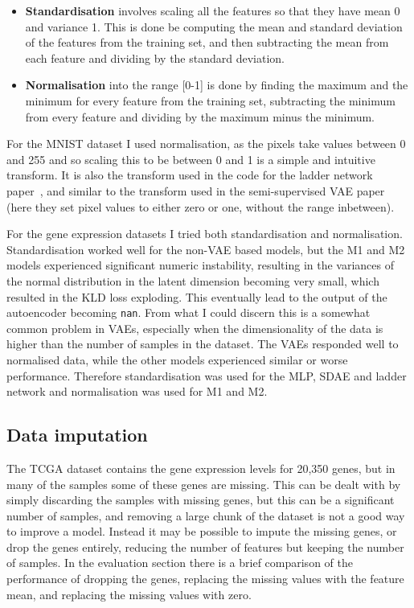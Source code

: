 \begin{itemize}
  \item \textbf{Standardisation} involves scaling all the features so that they have mean 0 and variance 1. This is done be computing the mean 
          and standard deviation of the features from the training set, and then subtracting the mean from each feature and dividing by the
          standard deviation.
  \item \textbf{Normalisation} into the range [0-1] is done by finding the maximum and the minimum for every feature from the training set,
          subtracting the minimum from every feature and dividing by the maximum minus the minimum.
\end{itemize}

For the MNIST dataset I used normalisation, as the pixels take values between 0 and 255 and so scaling this to be between 0 and 1 is 
a simple and intuitive transform. It is also the transform used in the code for the ladder network paper~\cite{DBLP:journals/corr/RasmusVHBR15}, 
and similar to the transform used in the semi-supervised VAE paper~\cite{DBLP:journals/corr/KingmaRMW14} (here they set pixel values to 
either zero or one, without the range inbetween).

For the gene expression datasets I tried both standardisation and normalisation. Standardisation worked well for the non-VAE based models,
but the M1 and M2 models experienced significant numeric instability, resulting in the variances of the normal distribution in the latent dimension 
becoming very small, which resulted in the KLD loss exploding.
This eventually lead to the output of the autoencoder becoming \texttt{nan}. From what I could discern this is a somewhat common problem in
VAEs, especially when the dimensionality of the data is higher than the number of samples in the dataset. The VAEs responded well to normalised
data, while the other models experienced similar or worse performance. Therefore standardisation was used for the MLP, SDAE and ladder 
network and normalisation was used for M1 and M2.

\subsection{Data imputation} \label{imput}
The TCGA dataset contains the gene expression levels for 20,350 genes, but in many of the samples some of these genes are missing.
This can be dealt with by simply discarding the samples with missing genes, but this can be a significant number of samples, and removing 
a large chunk of the dataset is not a good way to improve a model. Instead it may be possible to impute the missing genes, or drop the 
genes entirely, reducing the number of features but keeping the number of samples. In the evaluation section there is a brief comparison 
of the performance of dropping the genes, replacing the missing values with the feature mean, and replacing the missing values with zero.

